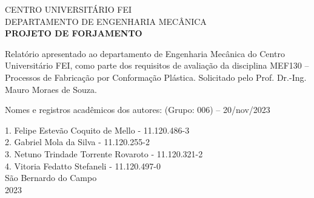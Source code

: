 \begin{titlepage}
      \begin{center}
      \Large CENTRO UNIVERSITÁRIO FEI \\ DEPARTAMENTO DE ENGENHARIA MECÂNICA
      \vspace{3 cm}
      \Large \textbf{\\PROJETO DE FORJAMENTO}
      \end{center}

    \vspace {2 cm}
    \hfill \parbox{8 cm}{Relatório apresentado ao departamento de Engenharia Mecânica do Centro Universitário FEI, como parte dos requisitos de avaliação da disciplina MEF130 – Processos de Fabricação por Conformação Plástica. Solicitado pelo Prof. Dr.-Ing. Mauro Moraes de Souza.}
    \vspace{2 cm}

    Nomes e registros acadêmicos dos autores: (Grupo: 006) – 20/nov/2023
    \vspace{1 cm}
    \begin{center}
      1. Felipe Estevão Coquito de Mello - 11.120.486-3 \\ 2. Gabriel Mola da Silva - 11.120.255-2 \\ 3. Netuno Trindade Torrente Rovaroto - 11.120.321-2 \\ 4. Vitoria Fedatto Stefaneli - 11.120.497-0
      \vspace{3 cm}
      \\ São Bernardo do Campo \\ 2023
    \end{center}
    \thispagestyle{empty}
    \setcounter{page}{0}
\end{titlepage}